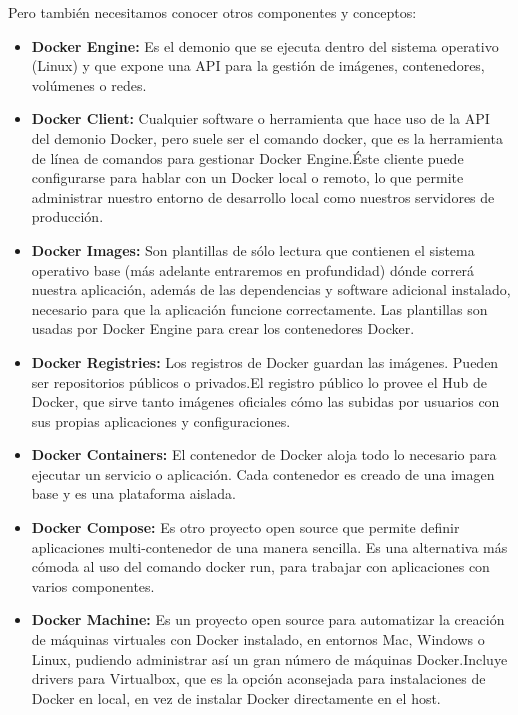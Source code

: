 \documentclass[preprint,12pt]{elsarticle}
\begin{document}
Pero también necesitamos conocer otros componentes y conceptos:

\begin{itemize}
\item \textbf{Docker Engine:} Es el demonio que se ejecuta dentro del sistema operativo (Linux) y que expone una API para la gestión de imágenes, contenedores, volúmenes o redes. 
\item \textbf{Docker Client:} Cualquier software o herramienta que hace uso de la API del demonio Docker, pero suele ser el comando docker, que es la herramienta de línea de comandos para gestionar Docker Engine.Éste cliente puede configurarse para hablar con un Docker local o remoto, lo que permite administrar nuestro entorno de desarrollo local como nuestros servidores de producción.
\item \textbf{Docker Images:} Son plantillas de sólo lectura que contienen el sistema operativo base (más adelante entraremos en profundidad) dónde correrá nuestra aplicación, además de las dependencias y software adicional instalado, necesario para que la aplicación funcione correctamente. Las plantillas son usadas por Docker Engine para crear los contenedores Docker.
\item \textbf{Docker Registries:} Los registros de Docker guardan las imágenes. Pueden ser repositorios públicos o privados.El registro público lo provee el Hub de Docker, que sirve tanto imágenes oficiales cómo las subidas por usuarios con sus propias aplicaciones y configuraciones.
\item \textbf{Docker Containers:} El contenedor de Docker aloja todo lo necesario para ejecutar un servicio o aplicación. Cada contenedor es creado de una imagen base y es una plataforma aislada.
\item \textbf{Docker Compose:} Es otro proyecto open source que permite definir aplicaciones multi-contenedor de una manera sencilla. Es una alternativa más cómoda al uso del comando docker run, para trabajar con aplicaciones con varios componentes.
\item \textbf{Docker Machine:} Es un proyecto open source para automatizar la creación de máquinas virtuales con Docker instalado, en entornos Mac, Windows o Linux, pudiendo administrar así un gran número de máquinas Docker.Incluye drivers para Virtualbox, que es la opción aconsejada para instalaciones de Docker en local, en vez de instalar Docker directamente en el host. 
\end{itemize}


\end{document}

